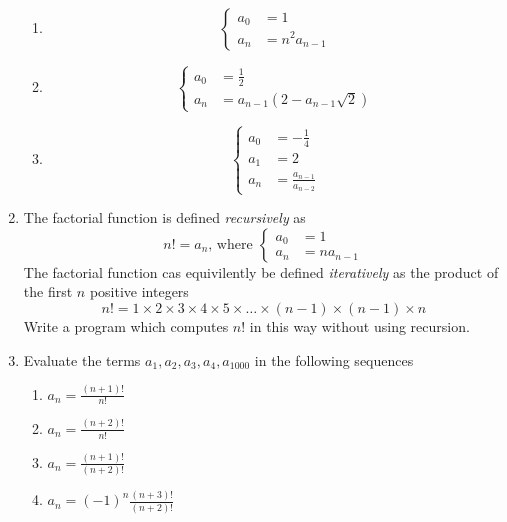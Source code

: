 \documentclass[11pt,a4paper,titlepage,oneside,openany]{article}
\numberwithin{equation}{section}
\numberwithin{algorithm}{section}
\numberwithin{figure}{section}
\numberwithin{table}{section}
\begin{document}
\begin{enumerate}
  \begin{multicols}{2}
    \begin{enumerate}
    \item
      \begin{equation*}
        \begin{cases}
          a_0&=1\\
          a_n&=n^2 a_{n-1}
        \end{cases}
      \end{equation*}
    \item
      \begin{equation*}
        \begin{cases}
          a_0&=\frac{1}{2}\\
          a_n&=a_{n-1}\left(2-a_{n-1}\sqrt{2}\right)
        \end{cases}
      \end{equation*}
    \item
      \begin{equation*}
        \begin{cases}
          a_0&=-\frac{1}{4}\\
          a_1&=2\\
          a_n&=\frac{a_{n-1}}{a_{n-2}}
        \end{cases}
      \end{equation*}
      
    \end{enumerate}
  \end{multicols}

\pagebreak

\item The factorial function is defined \emph{recursively} as
  \begin{equation*}
    n! = a_n \text{, where  }
    \begin{cases}
      a_0&=1\\
      a_n&=n a_{n-1}
    \end{cases}
  \end{equation*}
The factorial function cas equivilently be defined \emph{iteratively} as the product of the first $n$ positive integers\begin{equation*}
  n! = 1\times2\times3\times4\times5\times\ldots \times (n-1)\times(n-1)\times n
\end{equation*}
Write a program which computes $n!$ in this way without using recursion.

\item Evaluate the terms $a_1,a_2,a_3,a_4,a_{1000}$ in the following sequences
   \begin{multicols}{2}
    \begin{enumerate}
    \item $a_n=\frac{(n+1)!}{n!}$
    \item $a_n=\frac{(n+2)!}{n!}$
    \item $a_n=\frac{(n+1)!}{(n+2)!}$
    \item $a_n=(-1)^n \frac{(n+3)!}{(n+2)!}$
    \end{enumerate}        
  \end{multicols}


\end{enumerate}
\end{document}
